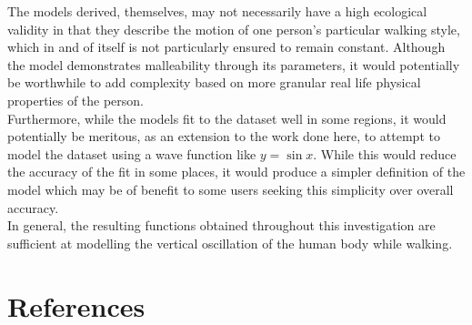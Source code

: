 \documentclass[12pt, a4paper]{article}
\begin{document}
The models derived, themselves, may not necessarily have a high ecological
validity in that they describe the motion of one person's particular walking
style, which in and of itself is not particularly ensured to remain constant.
Although the model demonstrates malleability through its parameters, it would
potentially be worthwhile to add complexity based on more granular real life
physical properties of the person. \\

Furthermore, while the models fit to the dataset well in some regions, it would
potentially be meritous, as an extension to the work done here, to attempt to
model the dataset using a wave function like $y=\sin x$. While this would reduce
the accuracy of the fit in some places, it would produce a simpler definition of
the model which may be of benefit to some users seeking this simplicity over
overall accuracy. \\

In general, the resulting functions obtained throughout this investigation are
sufficient at modelling the vertical oscillation of the human body while
walking.

\section{References}
\end{document}
